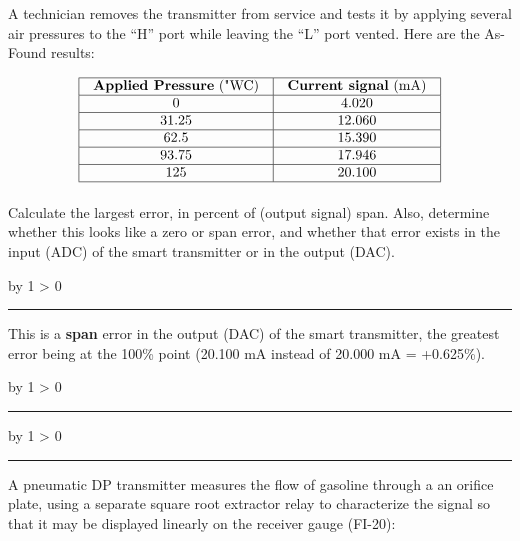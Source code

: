 \documentclass[12pt,a4paper]{article}
\def\oppgave{
            \advance\questnum by 1
            \ifnum \questnum > 0
                 \hrule
                 \vskip 3pt
                 \leftline{Oppgave \the\questnum}
                 \vskip 3pt \fi}
\def\svar{
           \advance\answnum by 1
           \ifnum \answnum > 0
                \hrule
                \vskip 3pt
                \leftline{Svar \the\answnum}
                \vskip 3pt \fi}
\def\notes{
           \advance\explnum by 1
           \ifnum \explnum > 0
                \hrule
                \vskip 3pt
                \leftline{Notes \the\explnum}
                \vskip 3pt \fi}
\begin{document}
A technician removes the transmitter from service and tests it by applying several air pressures to the ``H'' port while leaving the ``L'' port vented.  Here are the As-Found results:


$$\vbox{\offinterlineskip
\halign{\strut
\vrule \quad\hfil # \ \hfil & 
\vrule \quad\hfil # \ \hfil \vrule \cr
\noalign{\hrule}
%
{\bf Applied Pressure} ("WC) & {\bf Current signal} (mA) \cr
%
\noalign{\hrule}
%
0 & 4.020 \cr
%
\noalign{\hrule}
%
31.25 & 12.060 \cr
%
\noalign{\hrule}
%
62.5 & 15.390 \cr
%
\noalign{\hrule}
%
93.75 & 17.946 \cr
%
\noalign{\hrule}
%
125 & 20.100 \cr
%
\noalign{\hrule}
} %
}$$ %

Calculate the largest error, in percent of (output signal) span.  Also, determine whether this looks like a zero or span error, and whether that error exists in the input (ADC) of the smart transmitter or in the output (DAC).

\vskip 10pt \filbreak 





\svar{} 

This is a {\bf span} error in the output (DAC) of the smart transmitter, the greatest error being at the 100\% point (20.100 mA instead of 20.000 mA = +0.625\%). 

\vskip 10pt \filbreak 





\notes{} 



\vfil \eject 


\oppgave{} 

A pneumatic DP transmitter measures the flow of gasoline through a an orifice plate, using a separate square root extractor relay to characterize the signal so that it may be displayed linearly on the receiver gauge (FI-20):
\end{document}
